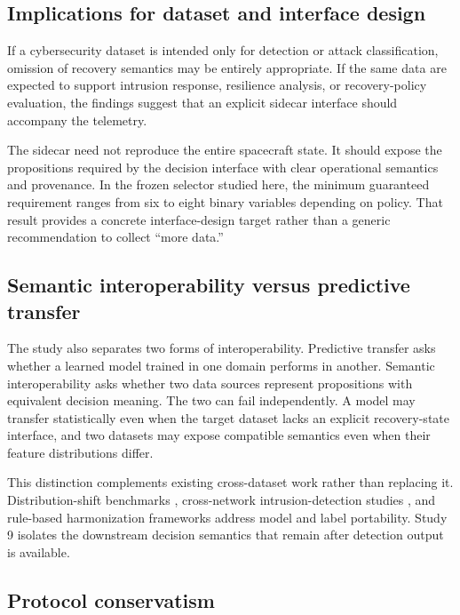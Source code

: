 \documentclass[preprint,12pt]{elsarticle}
\begin{document}
\subsection{Implications for dataset and interface design}

If a cybersecurity dataset is intended only for detection or attack classification, omission of recovery semantics may be entirely appropriate. If the same data are expected to support intrusion response, resilience analysis, or recovery-policy evaluation, the findings suggest that an explicit sidecar interface should accompany the telemetry.

The sidecar need not reproduce the entire spacecraft state. It should expose the propositions required by the decision interface with clear operational semantics and provenance. In the frozen selector studied here, the minimum guaranteed requirement ranges from six to eight binary variables depending on policy. That result provides a concrete interface-design target rather than a generic recommendation to collect ``more data.''

\subsection{Semantic interoperability versus predictive transfer}

The study also separates two forms of interoperability. Predictive transfer asks whether a learned model trained in one domain performs in another. Semantic interoperability asks whether two data sources represent propositions with equivalent decision meaning. The two can fail independently. A model may transfer statistically even when the target dataset lacks an explicit recovery-state interface, and two datasets may expose compatible semantics even when their feature distributions differ.

This distinction complements existing cross-dataset work rather than replacing it. Distribution-shift benchmarks \cite{koh2021wilds}, cross-network intrusion-detection studies \cite{cerasuolo2026transfer}, and rule-based harmonization frameworks \cite{rodriguez2026harmonization} address model and label portability. Study 9 isolates the downstream decision semantics that remain after detection output is available.

\subsection{Protocol conservatism}
\end{document}
